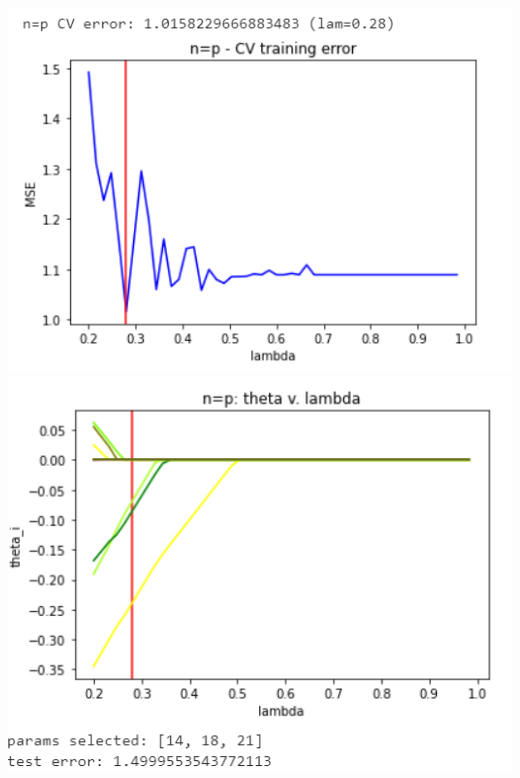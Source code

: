 \documentclass[11pt]{article}
\begin{document}
\begin{center}
\includegraphics[scale=0.7]{charts/ridge_st_corr_n_eq_p_err.PNG}
\includegraphics[scale=0.7]{charts/ridge_st_corr_n_eq_p_thetas.PNG}


\end{center}
\end{document}
